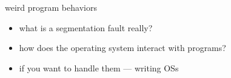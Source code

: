 
\begin{frame}{weird program behaviors}
    \begin{itemize}
    \item what is a segmentation fault really?
    \item how does the operating system interact with programs?
    \item if you want to handle them --- writing OSs
    \end{itemize}
\end{frame}

